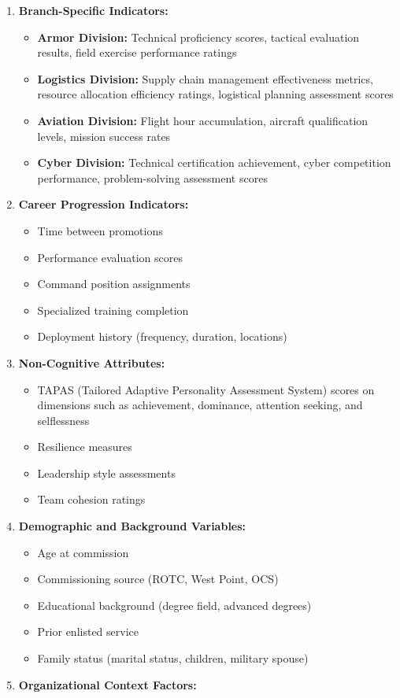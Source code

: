 \documentclass[./main.tex]{subfiles}
\providecommand{\tightlist}{%
  \setlength{\itemsep}{0pt}\setlength{\parskip}{0pt}}
\begin{document}
\begin{enumerate}
\def\labelenumi{\arabic{enumi}.}
\tightlist
\item
  \textbf{Branch-Specific Indicators:}

  \begin{itemize}
  \tightlist
  \item
    \textbf{Armor Division:} Technical proficiency scores, tactical
    evaluation results, field exercise performance ratings
  \item
    \textbf{Logistics Division:} Supply chain management effectiveness
    metrics, resource allocation efficiency ratings, logistical planning
    assessment scores
  \item
    \textbf{Aviation Division:} Flight hour accumulation, aircraft
    qualification levels, mission success rates
  \item
    \textbf{Cyber Division:} Technical certification achievement, cyber
    competition performance, problem-solving assessment scores
  \end{itemize}
\item
  \textbf{Career Progression Indicators:}

  \begin{itemize}
  \tightlist
  \item
    Time between promotions
  \item
    Performance evaluation scores
  \item
    Command position assignments
  \item
    Specialized training completion
  \item
    Deployment history (frequency, duration, locations)
  \end{itemize}
\item
  \textbf{Non-Cognitive Attributes:}

  \begin{itemize}
  \tightlist
  \item
    TAPAS (Tailored Adaptive Personality Assessment System) scores on
    dimensions such as achievement, dominance, attention seeking, and
    selflessness
  \item
    Resilience measures
  \item
    Leadership style assessments
  \item
    Team cohesion ratings
  \end{itemize}
\item
  \textbf{Demographic and Background Variables:}

  \begin{itemize}
  \tightlist
  \item
    Age at commission
  \item
    Commissioning source (ROTC, West Point, OCS)
  \item
    Educational background (degree field, advanced degrees)
  \item
    Prior enlisted service
  \item
    Family status (marital status, children, military spouse)
  \end{itemize}
\item
  \textbf{Organizational Context Factors:}


\end{enumerate}
\end{document}
